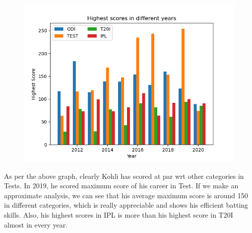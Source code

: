 \documentclass[12pt]{article}
\begin{document}
    
    \begin{figure}[h]
    \begin{center}
    \includegraphics[width=1\linewidth]{assign/Group_bar.png}
    \end{center}
    \end{figure}
    
    
    \rule{0mm}{10mm}
    As per the above graph, clearly Kohli has scored at par wrt other categories in Tests. In 2019, he scored maximum score of his career in Test. If we make an approximate analysis, we can see that his average maximum score is around 150 in different categories, which is really appreciable and shows his efficient batting skills. Also, his highest scores in IPL is more than his highest score in T20I almost in every year. 
\newpage
    
\end{document}
